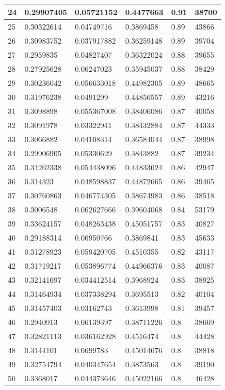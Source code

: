 \begin{longtable}{|l|l|l|l|l|l|}
24 & 0.29907405 & 0.05721152 & 0.4477663 & 0.91 & 38700 \\ \hline 
25 & 0.30322614 & 0.04749716 & 0.3869458 & 0.89 & 43866 \\ \hline 
26 & 0.30983752 & 0.037917882 & 0.36259148 & 0.89 & 39704 \\ \hline 
27 & 0.2959835 & 0.04827407 & 0.36322024 & 0.88 & 39655 \\ \hline 
28 & 0.27925628 & 0.06247023 & 0.35945037 & 0.88 & 38429 \\ \hline 
29 & 0.30236042 & 0.056633018 & 0.44982305 & 0.89 & 48665 \\ \hline 
30 & 0.31976238 & 0.0491299 & 0.44856557 & 0.89 & 43216 \\ \hline 
31 & 0.3098898 & 0.055367008 & 0.38406086 & 0.87 & 40058 \\ \hline 
32 & 0.3091978 & 0.03322941 & 0.38432884 & 0.87 & 44333 \\ \hline 
33 & 0.3066882 & 0.04108314 & 0.36584044 & 0.87 & 38998 \\ \hline 
34 & 0.29906905 & 0.05330629 & 0.3843882 & 0.87 & 39234 \\ \hline 
35 & 0.31262338 & 0.054438096 & 0.44833624 & 0.86 & 42947 \\ \hline 
36 & 0.314323 & 0.048598837 & 0.44872665 & 0.86 & 39465 \\ \hline 
37 & 0.30760863 & 0.046774305 & 0.38674983 & 0.86 & 38518 \\ \hline 
38 & 0.3006548 & 0.062627666 & 0.39604068 & 0.84 & 53179 \\ \hline 
39 & 0.33624157 & 0.048263438 & 0.45051757 & 0.83 & 40827 \\ \hline 
40 & 0.29188314 & 0.06950766 & 0.3869841 & 0.83 & 45633 \\ \hline 
41 & 0.31278923 & 0.059420705 & 0.4510355 & 0.82 & 43117 \\ \hline 
42 & 0.31719217 & 0.053896774 & 0.44966376 & 0.83 & 40087 \\ \hline 
43 & 0.32141697 & 0.034412514 & 0.3968924 & 0.83 & 38925 \\ \hline 
44 & 0.31464934 & 0.037338294 & 0.3695513 & 0.82 & 40104 \\ \hline 
45 & 0.31457403 & 0.03162743 & 0.3613998 & 0.81 & 39457 \\ \hline 
46 & 0.2940913 & 0.06139397 & 0.38711226 & 0.8 & 38669 \\ \hline 
47 & 0.32821113 & 0.036162928 & 0.4516474 & 0.8 & 44428 \\ \hline 
48 & 0.3144101 & 0.0699783 & 0.45014676 & 0.8 & 38818 \\ \hline 
49 & 0.32754794 & 0.040347654 & 0.3873563 & 0.8 & 39190 \\ \hline 
50 & 0.3368017 & 0.044373646 & 0.45022166 & 0.8 & 46428 \\ \hline 
\end{longtable}